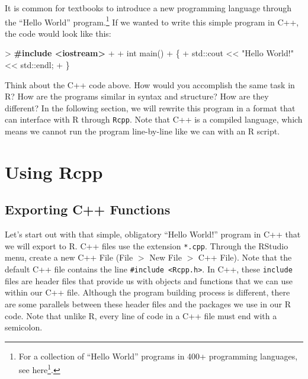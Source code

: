 \documentclass[
]{krantz}
\makeatletter
\newenvironment{Shaded}{\begin{snugshade}}{\end{snugshade}}
\newcommand{\BuiltInTok}[1]{#1}
\newcommand{\DataTypeTok}[1]{\textcolor[rgb]{0.27,0.27,0.27}{#1}}
\newcommand{\ErrorTok}[1]{\textcolor[rgb]{0.14,0.14,0.14}{\textbf{#1}}}
\newcommand{\NormalTok}[1]{#1}
\newcommand{\StringTok}[1]{\textcolor[rgb]{0.5,0.5,0.5}{#1}}
\renewcommand{\href}[2]{#2\footnote{\url{#1}}}
\newenvironment{kframe}{%
\medskip{}
\setlength{\fboxsep}{.8em}
 \def\at@end@of@kframe{}%
 \ifinner\ifhmode%
  \def\at@end@of@kframe{\end{minipage}}%
  \begin{minipage}{\columnwidth}%
 \fi\fi%
 \def\FrameCommand##1{\hskip\@totalleftmargin \hskip-\fboxsep
 \colorbox{shadecolor}{##1}\hskip-\fboxsep
     \hskip-\linewidth \hskip-\@totalleftmargin \hskip\columnwidth}%
 \MakeFramed {\advance\hsize-\width
   \@totalleftmargin\z@ \linewidth\hsize
   \@setminipage}}%
 {\par\unskip\endMakeFramed%
 \at@end@of@kframe}
\renewenvironment{Shaded}{\begin{kframe}}{\end{kframe}}
\makeatother
\begin{document}
It is common for textbooks to introduce a new programming language through the ``Hello World'' program.\footnote{For a collection of ``Hello World'' programs in 400+ programming languages, see \href{https://helloworldcollection.github.io/}{here}.} If we wanted to write this simple program in C++, the code would look like this:

\begin{Shaded}
\begin{Highlighting}[]
\NormalTok{\textgreater{} }\ErrorTok{\#include \textless{}iostream\textgreater{}}
\NormalTok{+ }
\NormalTok{+ }\DataTypeTok{int}\NormalTok{ main()}
\NormalTok{+ \{}
\NormalTok{+     }\BuiltInTok{std::}\NormalTok{cout \textless{}\textless{} }\StringTok{"Hello World!"}\NormalTok{ \textless{}\textless{} }\BuiltInTok{std::}\NormalTok{endl;}
\NormalTok{+ \}}
\end{Highlighting}
\end{Shaded}

Think about the C++ code above. How would you accomplish the same task in R? How are the programs similar in syntax and structure? How are they different? In the following section, we will rewrite this program in a format that can interface with R through \texttt{Rcpp}. Note that C++ is a compiled language, which means we cannot run the program line-by-line like we can with an R script.

\hypertarget{using-rcpp}{%
\section{Using Rcpp}\label{using-rcpp}}

\hypertarget{exporting-c-functions}{%
\subsection{Exporting C++ Functions}\label{exporting-c-functions}}

Let's start out with that simple, obligatory ``Hello World!'' program in C++ that we will export to R. C++ files use the extension \texttt{*.cpp}. Through the RStudio menu, create a new C++ File (File \(>\) New File \(>\) C++ File). Note that the default C++ file contains the line \texttt{\#include\ \textless{}Rcpp.h\textgreater{}}. In C++, these \texttt{include} files are header files that provide us with objects and functions that we can use within our C++ file. Although the program building process is different, there are some parallels between these header files and the packages we use in our R code. Note that unlike R, every line of code in a C++ file must end with a semicolon.
\end{document}
